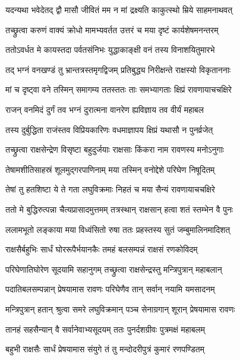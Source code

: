 \twolineshloka
{यदन्यथा भवेदेतद् द्वौ मासौ जीवितं मम}
{न मां द्रक्ष्यति काकुत्स्थो म्रिये साहमनाथवत्} %

\twolineshloka
{तच्छ्रुत्वा करुणं वाक्यं क्रोधो मामभ्यवर्तत}
{उत्तरं च मया दृष्टं कार्यशेषमनन्तरम्} %

\twolineshloka
{ततोऽवर्धत मे कायस्तदा पर्वतसंनिभः}
{युद्धाकाङ्क्षी वनं तस्य विनाशयितुमारभे} %

\twolineshloka
{तद् भग्नं वनखण्डं तु भ्रान्तत्रस्तमृगद्विजम्}
{प्रतिबुद्ध्य निरीक्षन्ते राक्षस्यो विकृताननाः} %

\twolineshloka
{मां च दृष्ट्वा वने तस्मिन् समागम्य ततस्ततः}
{ताः समभ्यागताः क्षिप्रं रावणायाचचक्षिरे} %

\twolineshloka
{राजन् वनमिदं दुर्गं तव भग्नं दुरात्मना}
{वानरेण ह्यविज्ञाय तव वीर्यं महाबल} %

\twolineshloka
{तस्य दुर्बुद्धिता राजंस्तव विप्रियकारिणः}
{वधमाज्ञापय क्षिप्रं यथासौ न पुनर्व्रजेत्} %

\twolineshloka
{तच्छ्रुत्वा राक्षसेन्द्रेण विसृष्टा बहुदुर्जयाः}
{राक्षसाः किंकरा नाम रावणस्य मनोऽनुगाः} %

\twolineshloka
{तेषामशीतिसाहस्रं शूलमुद्गरपाणिनाम्}
{मया तस्मिन् वनोद्देशे परिघेण निषूदितम्} %

\twolineshloka
{तेषां तु हतशिष्टा ये ते गता लघुविक्रमाः}
{निहतं च मया सैन्यं रावणायाचचक्षिरे} %

\twolineshloka
{ततो मे बुद्धिरुत्पन्ना चैत्यप्रासादमुत्तमम्}
{तत्रस्थान् राक्षसान् हत्वा शतं स्तम्भेन वै पुनः} %

\twolineshloka
{ललामभूतो लङ्काया मया विध्वंसितो रुषा}
{ततः प्रहस्तस्य सुतं जम्बुमालिनमादिशत्} %

\twolineshloka
{राक्षसैर्बहुभिः सार्धं घोररूपैर्भयानकैः}
{तमहं बलसम्पन्नं राक्षसं रणकोविदम्} %

\twolineshloka
{परिघेणातिघोरेण सूदयामि सहानुगम्}
{तच्छ्रुत्वा राक्षसेन्द्रस्तु मन्त्रिपुत्रान् महाबलान्} %

\twolineshloka
{पदातिबलसम्पन्नान् प्रेषयामास रावणः}
{परिघेणैव तान् सर्वान् नयामि यमसादनम्} %

\twolineshloka
{मन्त्रिपुत्रान् हतान् श्रुत्वा समरे लघुविक्रमान्}
{पञ्च सेनाग्रगान् शूरान् प्रेषयामास रावणः} %

\twolineshloka
{तानहं सहसैन्यान् वै सर्वानेवाभ्यसूदयम्}
{ततः पुनर्दशग्रीवः पुत्रमक्षं महाबलम्} %

\twolineshloka
{बहुभी राक्षसैः सार्धं प्रेषयामास संयुगे}
{तं तु मन्दोदरीपुत्रं कुमारं रणपण्डितम्} %

